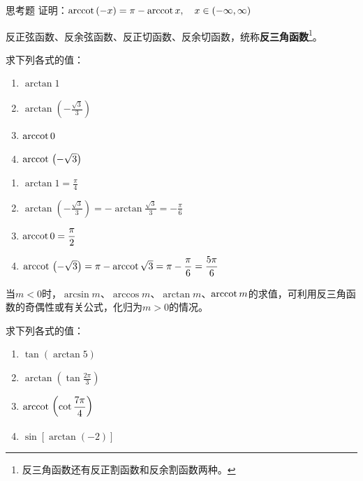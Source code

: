 \begin{thm}
    {思考题} 证明：${\rm arccot\,}(-x)=\pi-{\rm arccot\,} x,\quad x\in (-\infty,\infty)$
\end{thm}

反正弦函数、反余弦函数、反正切函数、反余切函数，统称\textbf{反三角函数}\footnote{反三角函数还有反正割函数和反余割函数两种。}。



\begin{example}
    求下列各式的值：
\begin{multicols}{2}
\begin{enumerate}[(1)]
    \item $\arctan1 $
    \item $\arctan\left(-\frac{\sqrt{3}}{3}\right) $
    \item ${\rm arccot\,}0 $
    \item ${\rm arccot\,}\left(-\sqrt{3}\right) $
\end{enumerate}
\end{multicols}
\end{example}

\begin{solution}
\begin{enumerate}[(1)]
    \item $\arctan1 =\frac{\pi}{4}$
    \item $\arctan\left(-\frac{\sqrt{3}}{3}\right)=-\arctan\frac{\sqrt{3}}{3}=-\frac{\pi}{6} $
    \item ${\rm arccot\,}0 =\dfrac{\pi}{2}$
    \item ${\rm arccot\,}\left(-\sqrt{3}\right) =\pi-{\rm arccot\,}\sqrt{3}=\pi-\dfrac{\pi}{6}=\dfrac{5\pi}{6}$
\end{enumerate}    
\end{solution}

\begin{remark}
当$m<0$时，$\arcsin m$、$\arccos m$、$\arctan m$、${\rm arccot\,} m$的求值，可利用反三角函数的奇偶性或有关公式，化归为$m>0$的情况。
\end{remark}

\begin{example}
    求下列各式的值：
\begin{multicols}{2}
\begin{enumerate}[(1)]
    \item $\tan(\arctan 5)$
    \item $\arctan\left(\tan\frac{2\pi}{3}\right)$
    \item ${\rm arccot\,}\left(\cot\dfrac{7\pi}{4}\right)$
    \item $\sin[\arctan(-2)]$
\end{enumerate}
\end{multicols}
\end{example}

